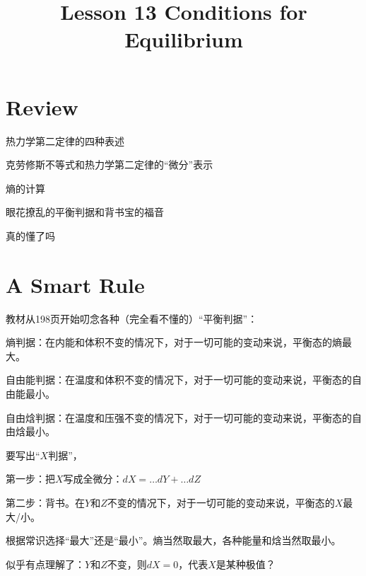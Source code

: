 \documentclass[CJK]{beamer}
\title{Lesson 13 Conditions for Equilibrium }
\author{}
\date{}
\begin{document}

\section{Review}

\begin{frame}
\bch 
\bitem
\item{热力学第二定律的四种表述}
\item{克劳修斯不等式和热力学第二定律的“微分”表示}
\item{熵的计算}
\eitem
\ech
\end{frame}

\begin{frame}
\bch
\bitem
\item{眼花撩乱的平衡判据和背书宝的福音}
\item{真的懂了吗}
\eitem
\ech
\end{frame}


\section{A Smart Rule}

\begin{frame}
\bch
教材从198页开始叨念各种（完全看不懂的）“平衡判据”：

\bitem
\item{熵判据：在内能和体积不变的情况下，对于一切可能的变动来说，平衡态的熵最大。}
\item{自由能判据：在温度和体积不变的情况下，对于一切可能的变动来说，平衡态的自由能最小。}
\item{自由焓判据：在温度和压强不变的情况下，对于一切可能的变动来说，平衡态的自由焓最小。}
\eitem

\ech
\end{frame}

\begin{frame}
\bch
{}

要写出“$X$判据”，

\bitem
\item{第一步：把$X$写成全微分：$dX = \ldots dY + \ldots dZ$}
\item{第二步：背书。在$Y$和$Z$不变的情况下，对于一切可能的变动来说，平衡态的$X$最大/小。}
\item{根据常识选择“最大”还是“最小”。熵当然取最大，各种能量和焓当然取最小。}
\eitem

似乎有点理解了：$Y$和$Z$不变，则$dX = 0$，代表$X$是某种极值？
\ech
\end{frame}
\end{document}
